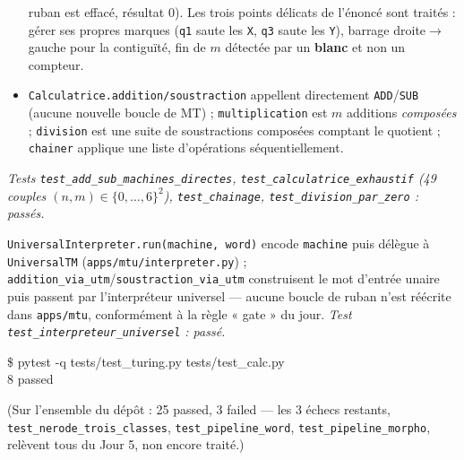 \documentclass[11pt,a4paper]{scrartcl}
\begin{document}
\begin{description}[leftmargin=1.6em,style=nextline]
\begin{itemize}
        ruban est effacé, résultat $0$). Les trois points délicats de l'énoncé
        sont traités : gérer ses propres marques (\texttt{q1} saute les
        \texttt{X}, \texttt{q3} saute les \texttt{Y}), barrage droite$\to$gauche
        pour la contiguïté, fin de $m$ détectée par un \textbf{blanc} et non un
        compteur.
      \item \texttt{Calculatrice.addition/soustraction} appellent directement
        \texttt{ADD}/\texttt{SUB} (aucune nouvelle boucle de MT) ;
        \texttt{multiplication} est $m$ additions \emph{composées} ;
        \texttt{division} est une suite de soustractions composées comptant le
        quotient ; \texttt{chainer} applique une liste d'opérations séquentiellement.
    \end{itemize}
    \emph{Tests \texttt{test\_add\_sub\_machines\_directes},
    \texttt{test\_calculatrice\_exhaustif} (49 couples $(n,m)\in\{0,\dots,6\}^2$),
    \texttt{test\_chainage}, \texttt{test\_division\_par\_zero} : passés.}
  \item[E4.4] \texttt{UniversalInterpreter.run(machine, word)} encode
    \texttt{machine} puis délègue à \texttt{UniversalTM} (\texttt{apps/mtu/interpreter.py}) ;
    \texttt{addition\_via\_utm}/\texttt{soustraction\_via\_utm} construisent le
    mot d'entrée unaire puis passent par l'interpréteur universel — aucune
    boucle de ruban n'est réécrite dans \texttt{apps/mtu}, conformément à la
    règle « gate » du jour. \emph{Test \texttt{test\_interpreteur\_universel} : passé.}
\end{description}

\begin{exemple}
\ttfamily \$ pytest -q tests/test\_turing.py tests/test\_calc.py\\
8 passed
\end{exemple}
\noindent (Sur l'ensemble du dépôt : 25 passed, 3 failed — les 3 échecs restants,
\texttt{test\_nerode\_trois\_classes}, \texttt{test\_pipeline\_word},
\texttt{test\_pipeline\_morpho}, relèvent tous du Jour 5, non encore traité.)
\end{document}
